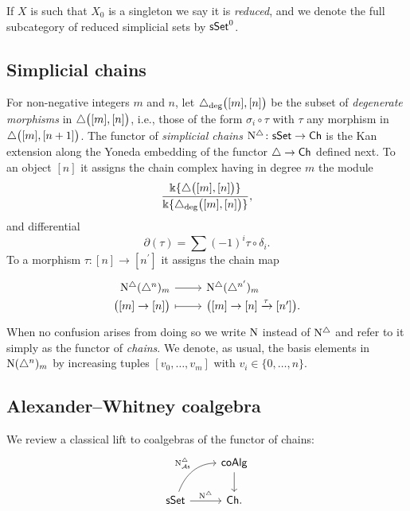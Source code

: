 If $X$ is such that $X_0$ is a singleton we say it is \textit{reduced}, and we denote the full subcategory of reduced simplicial sets by $\mathsf{sSet}^0$.

\subsection{Simplicial chains} \label{ss:simplicial sets}

For non-negative integers $m$ and $n$, let $\triangle_{\deg} \big( [m], [n] \big)$ be the subset of \textit{degenerate morphisms} in $\triangle \big( [m], [n] \big)$, i.e., those of the form $\sigma_i \circ \tau$ with $\tau$ any morphism in $\triangle \big( [m], [n+1] \big)$.
The functor of \textit{simplicial chains} $\operatorname{N^{\triangle}} \colon \mathsf{sSet} \to \mathsf{Ch}$ is the Kan extension along the Yoneda embedding of the functor $\triangle \to \mathsf{Ch}$ defined next.
To an object $[n]$ it assigns the chain complex having in degree $m$ the module
\[
\frac{\Bbbk\{\triangle \big( [m], [n] \big) \}}{\Bbbk\{\triangle_{\deg} \big( [m], [n] \big) \}},
\]
and differential
\[
\partial(\tau) = \sum (-1)^i \tau \circ \delta_i.
\]
To a morphism $\tau \colon [n] \to [n^\prime]$ it assigns the chain map
\[
\begin{tikzcd}[row sep=-3pt, column sep=normal,
/tikz/column 1/.append style={anchor=base east},
/tikz/column 2/.append style={anchor=base west}]
\schains(\simplex^n)_m \arrow[r] &  \schains(\simplex^{n^\prime})_m \\
\big( [m] \to [n] \big) \arrow[r, mapsto] & \big( [m] \to [n] \xra{\tau} [n^\prime] \big).
\end{tikzcd}
\]
When no confusion arises from doing so we write $\operatorname{N}$ instead of $\operatorname{N^{\triangle}}$ and refer to it simply as the functor of \textit{chains}.
We denote, as usual, the basis elements in $\operatorname{N}(\triangle^n)_m$ by increasing tuples $[v_0, \dots, v_m]$ with $v_i \in \{0, \dots, n\}$.

\subsection{Alexander--Whitney coalgebra} \label{ss:aw coalgebra}

We review a classical lift to coalgebras of the functor of chains:
\[
\begin{tikzcd}
& \coAlg \arrow[d] \\
\sSet \arrow[r, "\schains"] \arrow[ur, "\schainsAs", out=70, in=180] & \Ch.
\end{tikzcd}
\]

